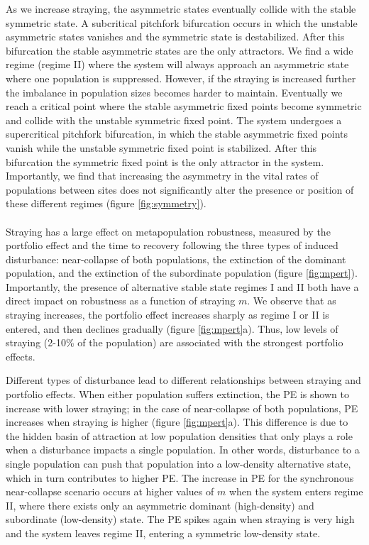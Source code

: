 \documentclass{revtex4}
\begin{document}
As we increase straying, the asymmetric states eventually collide with the stable symmetric state. 
A subcritical pitchfork bifurcation occurs in which the unstable asymmetric states vanishes and the symmetric state is destabilized. 
After this bifurcation the stable asymmetric states are the only attractors. 
We find a wide regime (regime II) where the system will always approach an asymmetric state where one population is suppressed. 
However, if the straying is increased further the imbalance in population sizes becomes harder to maintain. 
Eventually we reach a critical point where the stable asymmetric fixed points become symmetric and collide with the unstable symmetric fixed point. 
The system undergoes a supercritical pitchfork bifurcation, in which the stable asymmetric fixed points vanish while the unstable symmetric fixed point is stabilized. 
After this bifurcation the symmetric fixed point is the only attractor in the system. 
Importantly, we find that increasing the asymmetry in the vital rates of populations between sites does not significantly alter the presence or position of these different regimes (figure \ref{fig:symmetry}).\\


 \\
Straying has a large effect on metapopulation robustness, measured by the portfolio effect and the time to recovery following the three types of induced disturbance: near-collapse of both populations, the extinction of the dominant population, and the extinction of the subordinate population (figure \ref{fig:mpert}).
Importantly, the presence of alternative stable state regimes I and II both have a direct impact on robustness as a function of straying $m$.
We observe that as straying increases, the portfolio effect increases sharply as regime I or II is entered, and then declines gradually (figure \ref{fig:mpert}a).
Thus, low levels of straying (2-10\% of the population) are associated with the strongest portfolio effects.

Different types of disturbance lead to different relationships between straying and portfolio effects.
When either population suffers extinction, the PE is shown to increase with lower straying; in the case of near-collapse of both populations, PE increases when straying is higher (figure \ref{fig:mpert}a).
This difference is due to the hidden basin of attraction at low population densities that only plays a role when a disturbance impacts a single population.
In other words, disturbance to a single population can push that population into a low-density alternative state, which in turn contributes to higher PE.
The increase in PE for the synchronous near-collapse scenario occurs at higher values of $m$ when the system enters regime II, where there exists only an asymmetric dominant (high-density) and subordinate (low-density) state.
The PE spikes again when straying is very high and the system leaves regime II, entering a symmetric low-density state.
\end{document}

